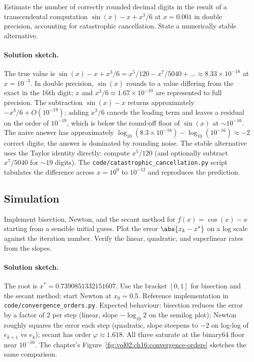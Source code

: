 \begin{exercise}
Estimate the number of correctly rounded decimal digits in the
result of a transcendental computation $\sin(x) - x + x^{3}/6$ at
$x = 0.001$ in double precision, accounting for catastrophic
cancellation. State a numerically stable alternative.
\end{exercise}

\paragraph{Solution sketch.}
The true value is $\sin(x) - x + x^{3}/6 = x^{5}/120 - x^{7}/5040
+ \ldots \approx 8.33 \times 10^{-18}$ at $x = 10^{-3}$. In double
precision, $\sin(x)$ rounds to a value differing from the exact in
the 16th digit; $x$ and $x^{3}/6 \approx 1.67 \times 10^{-10}$ are
represented to full precision. The subtraction $\sin(x) - x$
returns approximately $-x^{3}/6 + O(10^{-19})$; adding $x^{3}/6$
cancels the leading term and leaves a residual on the order of
$10^{-19}$, which is below the round-off floor of $\sin(x)$ at
$\sim 10^{-16}$. The naive answer has approximately
$\log_{10}(8.3 \times 10^{-18}) - \log_{10}(10^{-16}) \approx -2$
correct digits; the answer is dominated by rounding noise. The
stable alternative uses the Taylor identity directly: compute
$x^{5}/120$ (and optionally subtract $x^{7}/5040$ for $\sim 19$
digits). The
\texttt{code/catastrophic\_cancellation.py} script tabulates the
difference across $x = 10^{0}$ to $10^{-12}$ and reproduces the
prediction.

\subsection*{Simulation}

\begin{exercise}
Implement bisection, Newton, and the secant method for $f(x) =
\cos(x) - x$ starting from a sensible initial guess. Plot the
error $\abs{x_{k} - x^{*}}$ on a log scale against the iteration
number. Verify the linear, quadratic, and superlinear rates from
the slopes.
\end{exercise}

\paragraph{Solution sketch.}
The root is $x^{*} = 0.7390851332151607$. Use the bracket
$[0, 1]$ for bisection and the secant method; start Newton at
$x_{0} = 0.5$. Reference implementation in
\texttt{code/convergence\_orders.py}. Expected behaviour:
bisection reduces the error by a factor of 2 per step (linear,
slope $-\log_{10} 2$ on the semilog plot); Newton roughly
squares the error each step (quadratic, slope steepens to
$-2$ on log-log of $e_{k+1}$ vs $e_{k}$); secant has order
$\varphi \approx 1.618$. All three saturate at the binary64 floor
near $10^{-16}$. The chapter's
Figure~\ref{fig:vol02:ch16:convergence-orders} sketches the same
comparison.

